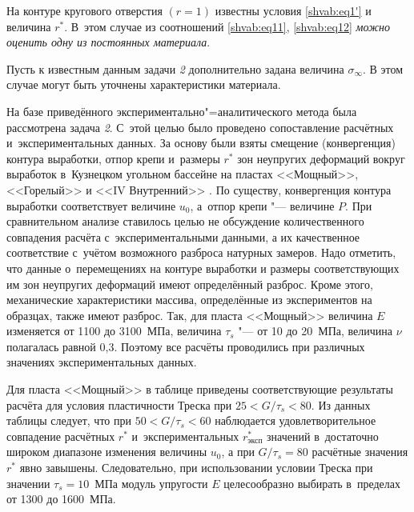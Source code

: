 \smallskip
\begin{task}[2]На контуре кругового отверстия $(r=1)$ известны условия \eqref{shvab:eq1'} и величина $r^\ast .$ 
В~этом случае из соотношений \rm \eqref{shvab:eq11}, \eqref{shvab:eq12} \it 
можно оценить одну из постоянных материала$.$
\end{task}

\smallskip

\begin{task}[3]Пусть к известным данным задачи {\sl 2} дополнительно задана  величина $\sigma _\infty .$ В этом случае могут быть уточнены характеристики материала\rm.
\end{task}

На базе приведённого экспериментально"=аналитического метода была рассмотрена задача {\sl 2}. 
С~этой целью было проведено сопоставление расчётных и~экспериментальных данных. 
За основу были взяты смещение (конвергенция) контура выработки, отпор крепи и~размеры $r^\ast $ зон неупругих деформаций вокруг выработок в~Кузнецком угольном бассейне на пластах <<Мощный>>, <<Горелый>> и <<IV Внутренний>> \cite{shvab:bib4}. 
По существу, конвергенция контура выработки соответствует величине $u_0$, а~отпор крепи "--- величине $P$. 
При сравнительном анализе ставилось целью не обсуждение количественного совпадения расчёта с~экспериментальными данными, а их
качественное соответствие с~учётом возможного разброса натурных замеров.
Надо отметить, что данные о~перемещениях на контуре выработки и размеры соответствующих им зон неупругих деформаций имеют определённый разброс.
Кроме этого, механические  характеристики массива, определённые из экспериментов на образцах, также имеют разброс. 
Так, для пласта <<Мощный>> величина $E$ изменяется от 1100 до 3100~МПа, величина $\tau _s$ "---  от 10 до 20~МПа, величина $\nu$ полагалась равной 0,3.
Поэтому все расчёты проводились при различных значениях экспериментальных данных.

Для пласта <<Мощный>> в таблице  приведены соответствующие результаты расчёта для условия пластичности Треска при $25<G/\tau_s<80$. 
Из данных таблицы следует, что при $50<G/\tau _s <60$ наблюдается удовлетворительное совпадение расчётных $r^\ast$  и~экспериментальных $r^\ast_\text{эксп}$  значений в~достаточно широком диапазоне изменения величины $u_0$,
а при $G/\tau _s=80$ расчётные значения $r^\ast$ явно завышены. 
Следовательно, при использовании условии Треска при значении $\tau _s =10$~МПа модуль упругости $E$
целесообразно выбирать в~пределах  от 1300 до  1600~МПа.



